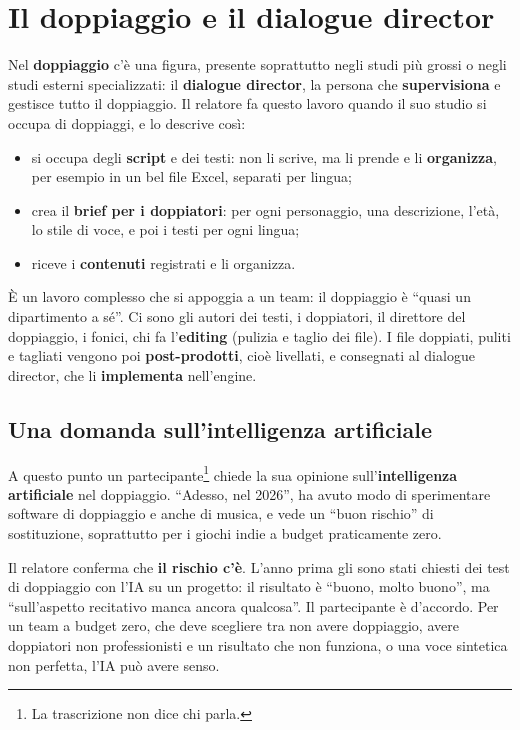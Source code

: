 \section{Il doppiaggio e il dialogue director}
\label{z9:sec:doppiaggio}

Nel \textbf{doppiaggio} c'è una figura, presente soprattutto negli studi più
grossi o negli studi esterni specializzati: il \textbf{dialogue director}, la
persona che \textbf{supervisiona} e gestisce tutto il doppiaggio. Il relatore fa
questo lavoro quando il suo studio si occupa di doppiaggi, e lo descrive così:
\begin{itemize}
  \item si occupa degli \textbf{script} e dei testi: non li scrive, ma li prende e
        li \textbf{organizza}, per esempio in un bel file Excel, separati per
        lingua;
  \item crea il \textbf{brief per i doppiatori}: per ogni personaggio, una
        descrizione, l'età, lo stile di voce, e poi i testi per ogni lingua;
  \item riceve i \textbf{contenuti} registrati e li organizza.
\end{itemize}
È un lavoro complesso che si appoggia a un team: il doppiaggio è ``quasi un
dipartimento a sé''. Ci sono gli autori dei testi, i doppiatori, il direttore del
doppiaggio, i fonici, chi fa l'\textbf{editing} (pulizia e taglio dei file).
I file doppiati, puliti e tagliati vengono poi \textbf{post-prodotti}, cioè
livellati, e consegnati al dialogue director, che li \textbf{implementa}
nell'engine.

\subsection{Una domanda sull'intelligenza artificiale}

A questo punto un partecipante\footnote{La trascrizione non dice chi parla.}
chiede la sua opinione sull'\textbf{intelligenza artificiale} nel doppiaggio.
``Adesso, nel 2026'', ha avuto modo di sperimentare software di doppiaggio e
anche di musica, e vede un ``buon rischio'' di sostituzione, soprattutto per i
giochi indie a budget praticamente zero.

Il relatore conferma che \textbf{il rischio c'è}. L'anno prima gli sono stati
chiesti dei test di doppiaggio con l'IA su un progetto: il risultato è
``buono, molto buono'', ma ``sull'aspetto recitativo manca ancora qualcosa''. Il
partecipante è d'accordo. Per un team a budget zero, che deve scegliere tra non
avere doppiaggio, avere doppiatori non professionisti e un risultato che non
funziona, o una voce sintetica non perfetta, l'IA può avere senso.

